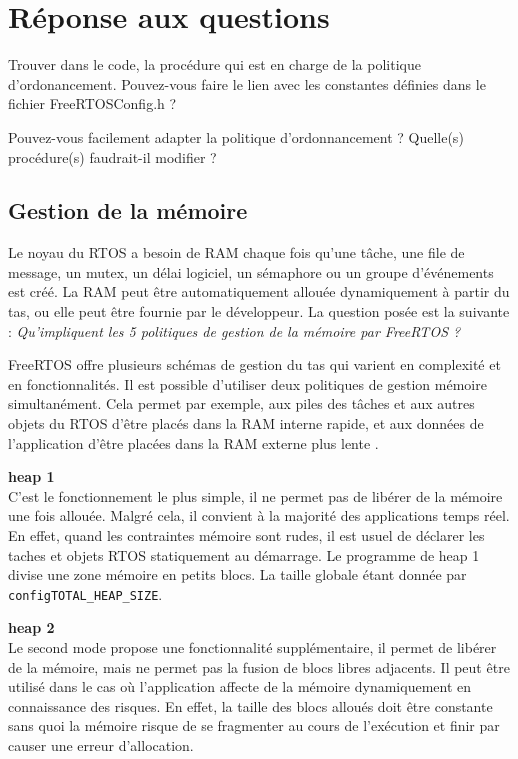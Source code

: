 \section{Réponse aux questions}


Trouver dans le code, la procédure qui est en charge de la politique d’ordonancement.
Pouvez-vous faire le lien avec les constantes définies dans le fichier
FreeRTOSConfig.h ?


Pouvez-vous facilement adapter la politique d’ordonnancement ? Quelle(s) procédure(s)
faudrait-il modifier ?



\subsection{Gestion de la mémoire}
Le noyau du RTOS a besoin de RAM chaque fois qu'une tâche, une file de message, un mutex, un délai logiciel, un sémaphore ou un groupe d'événements est créé. 
La RAM peut être automatiquement allouée dynamiquement à partir du tas, ou elle peut être fournie par le développeur.
La question posée est la suivante :
\textit{Qu’impliquent les 5 politiques de gestion de la mémoire par FreeRTOS ?}
\gap

FreeRTOS offre plusieurs schémas de gestion du tas qui varient en complexité et en fonctionnalités.
Il est possible d'utiliser deux politiques de gestion mémoire simultanément.
Cela permet par exemple, aux piles des tâches et aux autres objets du RTOS d'être placés dans la RAM interne rapide, et aux données de l'application d'être placées dans la RAM externe plus lente \cite{web_freeRTOS_heap}.

\noindent
\textbf{heap 1} \\
C'est le fonctionnement le plus simple, il ne permet pas de libérer de la mémoire une fois allouée.
Malgré cela, il convient à la majorité des applications temps réel.
En effet, quand les contraintes mémoire sont rudes, il est usuel de déclarer les taches et objets RTOS statiquement au démarrage.
Le programme de heap 1 divise une zone mémoire en petits blocs.
La taille globale étant donnée par \texttt{configTOTAL\_HEAP\_SIZE}.

\noindent
\textbf{heap 2} \\
Le second mode propose une fonctionnalité supplémentaire, il permet de libérer de la mémoire, mais ne permet pas la fusion de blocs libres adjacents.
Il peut être utilisé dans le cas où l'application affecte de la mémoire dynamiquement en connaissance des risques.
En effet, la taille des blocs alloués doit être constante sans quoi la mémoire risque de se fragmenter au cours de l'exécution et finir par causer une erreur d'allocation.

